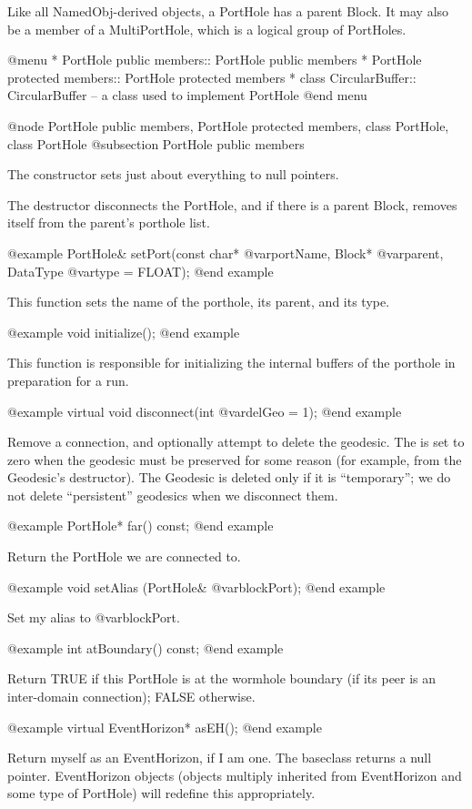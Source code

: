 Like all NamedObj-derived objects, a PortHole has a parent Block.  It
may also be a member of a MultiPortHole, which is a logical group of
PortHoles.

@menu
* PortHole public members::     PortHole public members
* PortHole protected members::  PortHole protected members
* class CircularBuffer::        CircularBuffer -- a class used to implement PortHole
@end menu

@node PortHole public members, PortHole protected members, class PortHole, class PortHole
@subsection PortHole public members

The constructor sets just about everything to null pointers.

The destructor disconnects the PortHole, and if there is a parent Block,
removes itself from the parent's porthole list.

@example
PortHole& setPort(const char* @var{portName}, Block* @var{parent},
                 DataType @var{type} = FLOAT);
@end example

This function sets the name of the porthole, its parent, and
its type.

@example
void initialize();
@end example

This function is responsible for initializing the internal buffers
of the porthole in preparation for a run.

@example
virtual void disconnect(int @var{delGeo} = 1);
@end example

Remove a connection, and optionally attempt to delete the geodesic.  The
is set to zero when the geodesic must be preserved for some reason (for
example, from the Geodesic's destructor).  The Geodesic is deleted only
if it is ``temporary''; we do not delete ``persistent'' geodesics when
we disconnect them.

@example
PortHole* far() const;
@end example

Return the PortHole we are connected to.

@example
void setAlias (PortHole& @var{blockPort});
@end example

Set my alias to @var{blockPort}.

@example
int atBoundary() const;
@end example

Return TRUE if this PortHole is at the wormhole boundary (if its peer is
an inter-domain connection); FALSE otherwise.

@example
virtual EventHorizon* asEH();
@end example

Return myself as an EventHorizon, if I am one.  The baseclass returns
a null pointer.  EventHorizon objects (objects multiply inherited from
EventHorizon and some type of PortHole) will redefine this
appropriately.

